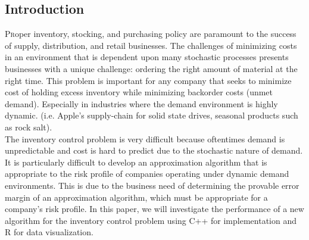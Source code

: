 \documentclass[twoside]{article}
\begin{document}
\begin{multicols}{2} %

\section{Introduction}

\lettrine[nindent=0em,lines=2]{P}roper inventory, stocking, and purchasing policy are paramount to the success of supply, distribution, and retail businesses. The challenges of minimizing costs in an environment that is dependent upon many stochastic processes presents businesses with a unique challenge: ordering the right amount of material at the right time. This problem is important for any company that seeks to minimize cost of holding excess inventory while minimizing backorder costs (unmet demand). Especially in industries where the demand environment is highly dynamic. (i.e. Apple's supply-chain for solid state drives, seasonal products such as rock salt). \\
The inventory control problem is very difficult because oftentimes demand is unpredictable and cost is hard to predict due to the stochastic nature of demand. It is particularly difficult to develop an approximation algorithm that is appropriate to the risk profile of companies operating under dynamic demand environments. This is due to the business need of determining the provable error margin of an approximation algorithm, which must be appropriate for a company's risk profile. In this paper, we will investigate the performance of a new algorithm\cite{CLAcha2} for the inventory control problem using C++ for implementation and R for data visualization.\\



\end{multicols}
\end{document}
